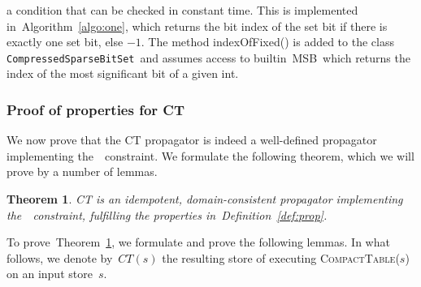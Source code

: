 \documentclass[a4paper,11pt]{article}
\newtheorem{theorem}{Theorem}[section]
\newcommand{\Algoref}[1]{Algorithm~\ref{#1}}
\newcommand{\Table}{\Constraint{Table}}
\newcommand{\Defref}[1]{Definition~\ref{#1}}
\newcommand{\Thmref}[1]{Theorem~\ref{#1}}
\newcommand{\SparseBitSet}{\texttt{CompressedSparseBitSet}}
\def\CompactTable{\textsc{CompactTable}}
\def\FixDomains{\textsc{FixDomains}}
\numberwithin{equation}{section}
\begin{document}
\begin{description}
\noindent
a condition that can be checked in constant time.
This is implemented in~\Algoref{algo:one}, which returns
the bit index of the set bit if there is exactly one set bit, else $-1$.
The method indexOfFixed() is added to the class \SparseBitSet~and assumes access to
builtin~\textsc{MSB}~which returns the index of the most significant bit of a given int.

\begin{algorithm}[t]
  \begin{algorithmic}[1]  %
    
  \end{algorithmic}
  \caption{Checking if exactly one bit is set in \SparseBitSet.}
  \label{algo:one}
\end{algorithm}

\end{description}

%     

\subsubsection{Proof of properties for CT}
\label{sec:proof}

We now prove that the CT propagator is indeed a well-defined propagator
implementing the~\Table~constraint. We formulate the following theorem, which
we will prove by a number of lemmas.

\begin{theorem} \label{thm:prop}
  CT is an idempotent, domain-consistent propagator implementing 
  the~\Table~constraint, fulfilling the properties in~\Defref{def:prop}.
\end{theorem}

To prove~\Thmref{thm:prop}, we formulate and prove the following lemmas.
In what follows, we denote by~$CT(s)$ the resulting store of executing
\CompactTable($s$) on an input store~$s$.
\end{document}
